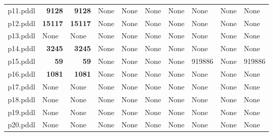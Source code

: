 \documentclass{article}
\begin{document}
\begin{tabular}{@{}lrrrrrrrrr@{}}
p11.pddl & \textbf{9128} & \textbf{9128} & \multicolumn{1}{|l|}{None} & \multicolumn{1}{|l|}{None} & \multicolumn{1}{|l|}{None} & \multicolumn{1}{|l|}{None} & \multicolumn{1}{|l|}{None} & \multicolumn{1}{|l|}{None} & \multicolumn{1}{|l|}{None} \\
p12.pddl & \textbf{15117} & \textbf{15117} & \multicolumn{1}{|l|}{None} & \multicolumn{1}{|l|}{None} & \multicolumn{1}{|l|}{None} & \multicolumn{1}{|l|}{None} & \multicolumn{1}{|l|}{None} & \multicolumn{1}{|l|}{None} & \multicolumn{1}{|l|}{None} \\
p13.pddl & \multicolumn{1}{|l|}{None} & \multicolumn{1}{|l|}{None} & \multicolumn{1}{|l|}{None} & \multicolumn{1}{|l|}{None} & \multicolumn{1}{|l|}{None} & \multicolumn{1}{|l|}{None} & \multicolumn{1}{|l|}{None} & \multicolumn{1}{|l|}{None} & \multicolumn{1}{|l|}{None} \\
p14.pddl & \textbf{3245} & \textbf{3245} & \multicolumn{1}{|l|}{None} & \multicolumn{1}{|l|}{None} & \multicolumn{1}{|l|}{None} & \multicolumn{1}{|l|}{None} & \multicolumn{1}{|l|}{None} & \multicolumn{1}{|l|}{None} & \multicolumn{1}{|l|}{None} \\
p15.pddl & \textbf{59} & \textbf{59} & \multicolumn{1}{|l|}{None} & \multicolumn{1}{|l|}{None} & \multicolumn{1}{|l|}{None} & \multicolumn{1}{|l|}{None} & 919886 & \multicolumn{1}{|l|}{None} & 919886 \\
p16.pddl & \textbf{1081} & \textbf{1081} & \multicolumn{1}{|l|}{None} & \multicolumn{1}{|l|}{None} & \multicolumn{1}{|l|}{None} & \multicolumn{1}{|l|}{None} & \multicolumn{1}{|l|}{None} & \multicolumn{1}{|l|}{None} & \multicolumn{1}{|l|}{None} \\
p17.pddl & \multicolumn{1}{|l|}{None} & \multicolumn{1}{|l|}{None} & \multicolumn{1}{|l|}{None} & \multicolumn{1}{|l|}{None} & \multicolumn{1}{|l|}{None} & \multicolumn{1}{|l|}{None} & \multicolumn{1}{|l|}{None} & \multicolumn{1}{|l|}{None} & \multicolumn{1}{|l|}{None} \\
p18.pddl & \multicolumn{1}{|l|}{None} & \multicolumn{1}{|l|}{None} & \multicolumn{1}{|l|}{None} & \multicolumn{1}{|l|}{None} & \multicolumn{1}{|l|}{None} & \multicolumn{1}{|l|}{None} & \multicolumn{1}{|l|}{None} & \multicolumn{1}{|l|}{None} & \multicolumn{1}{|l|}{None} \\
p19.pddl & \multicolumn{1}{|l|}{None} & \multicolumn{1}{|l|}{None} & \multicolumn{1}{|l|}{None} & \multicolumn{1}{|l|}{None} & \multicolumn{1}{|l|}{None} & \multicolumn{1}{|l|}{None} & \multicolumn{1}{|l|}{None} & \multicolumn{1}{|l|}{None} & \multicolumn{1}{|l|}{None} \\
p20.pddl & \multicolumn{1}{|l|}{None} & \multicolumn{1}{|l|}{None} & \multicolumn{1}{|l|}{None} & \multicolumn{1}{|l|}{None} & \multicolumn{1}{|l|}{None} & \multicolumn{1}{|l|}{None} & \multicolumn{1}{|l|}{None} & \multicolumn{1}{|l|}{None} & \multicolumn{1}{|l|}{None} \\
\end{tabular}
\end{document}
